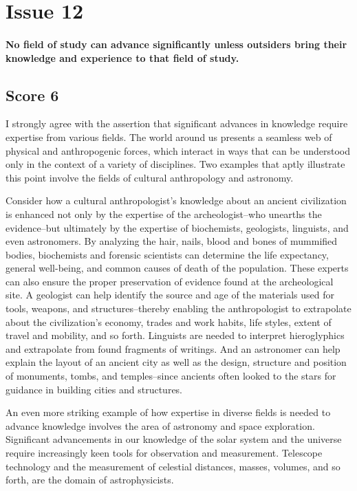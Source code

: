 \section{Issue 12}
\paragraph{
No field of study can advance significantly unless outsiders bring their knowledge and experience to that field of study.
}
\subsection{Score 6}


I strongly agree with the assertion that significant advances in knowledge require expertise from various fields.
The world around us presents a seamless web of physical and anthropogenic forces, which interact in ways that can be understood only in the context of a variety of disciplines.
Two examples that aptly illustrate this point involve the fields of cultural anthropology and astronomy.


Consider how a cultural anthropologist's knowledge about an ancient civilization is enhanced not only by the expertise of the archeologist--who unearths the evidence--but ultimately by the expertise of biochemists, geologists, linguists, and even astronomers.
By analyzing the hair, nails, blood and bones of mummified bodies, biochemists and forensic scientists can determine the life expectancy, general well-being, and common causes of death of the population.
These experts can also ensure the proper preservation of evidence found at the archeological site.
A geologist can help identify the source and age of the materials used for tools, weapons, and structures--thereby enabling the anthropologist to extrapolate about the civilization's economy, trades and work habits, life styles, extent of travel and mobility, and so forth.
Linguists are needed to interpret hieroglyphics and extrapolate from found fragments of writings.
And an astronomer can help explain the layout of an ancient city as well as the design, structure and position of monuments, tombs, and temples--since ancients often looked to the stars for guidance in building cities and structures.


An even more striking example of how expertise in diverse fields is needed to advance knowledge involves the area of astronomy and space exploration.
Significant advancements in our knowledge of the solar system and the universe require increasingly keen tools for observation and measurement.
Telescope technology and the measurement of celestial distances, masses, volumes, and so forth, are the domain of astrophysicists.


